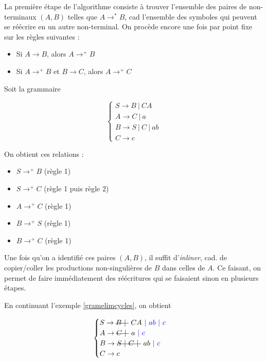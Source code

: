 La première étape de l'algorithme consiste à trouver l'ensemble des paires de non-terminaux $(A,B)$ telles que $A \rightarrow^* B$, cad l'ensemble des symboles qui peuvent se réécrire en un autre non-terminal. On procède encore une fois par point fixe sur les règles suivantes : 

\begin{itemize}
\item Si $A \rightarrow B$, alors $A \rightarrow^+ B$
\item Si $A \rightarrow^+ B$ et $B \rightarrow C$, alors $A \rightarrow^+ C$
\end{itemize}

\begin{example}
\label{gramelimcycles}
Soit la grammaire 

\[
\begin{cases}
S \rightarrow B~|~CA \\
A \rightarrow C~|~a \\
B \rightarrow S~|~C~|~ab \\
C \rightarrow c 
\end{cases}
\]

On obtient ces relations :

\begin{itemize}
\item $S \rightarrow^+ B$ (règle 1)
\item $S \rightarrow^+ C$ (règle 1 puis règle 2)
\item $A \rightarrow^+ C$ (règle 1)
\item $B \rightarrow^+ S$ (règle 1)
\item $B \rightarrow^+ C$ (règle 1)
\end{itemize}

\end{example}

Une fois qu'on a identifié ces paires $(A,B)$, il suffit d'\textit{inliner}, cad. de copier/coller les productions non-singulières de $B$ dans celles de $A$. Ce faisant, on permet de faire immédiatement des réécritures qui se faisaient sinon en plusieurs étapes. 

\begin{example}
En continuant l'exemple \ref{gramelimcycles}, on obtient 

\[
\begin{cases}
S \rightarrow \text{\st{$B~|~$}}~CA \textcolor{blue}{~|~ab~|~c} \\
A \rightarrow \text{\st{$C~|~$}}~a \textcolor{blue}{~|~c}\\
B \rightarrow \text{\st{$S~|~C~|~$}}~ab \textcolor{blue}{~|~c} \\
C \rightarrow c
\end{cases}
\]

\end{example}

